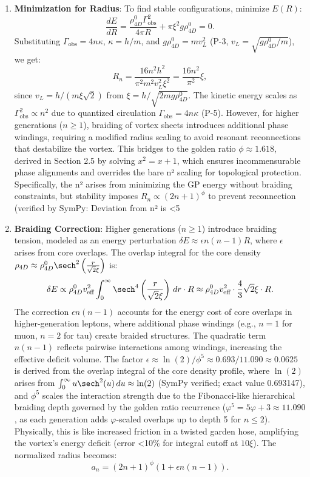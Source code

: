 \begin{enumerate}
\item \textbf{Minimization for Radius}: To find stable configurations, minimize $E(R)$:
   \[
   \frac{dE}{dR} = \frac{\rho_{4D}^0 \Gamma_{\text{obs}}^2}{4\pi R} + \pi \xi^2 g \rho_{4D}^0 = 0.
   \]
   Substituting $\Gamma_{\text{obs}} = 4 n \kappa$, $\kappa = h / m$, and $g \rho_{4D}^0 = m v_L^2$ (P-3, $v_L = \sqrt{g \rho_{4D}^0 / m}$), we get:
   \[
   R_n = \frac{16 n^2 h^2}{\pi^2 m^2 v_L^2 \xi^2} = \frac{16 n^2}{\pi^2} \xi,
   \]
   since $v_L = h / (m \xi \sqrt{2})$ from $\xi = h / \sqrt{2 m g \rho_{4D}^0}$. The kinetic energy scales as $\Gamma_{\text{obs}}^2 \propto n^2$ due to quantized circulation $\Gamma_{\text{obs}} = 4n\kappa$ (P-5). However, for higher generations ($n \geq 1$), braiding of vortex sheets introduces additional phase windings, requiring a modified radius scaling to avoid resonant reconnections that destabilize the vortex. This bridges to the golden ratio $\phi \approx 1.618$, derived in Section 2.5 by solving $x^2 = x + 1$, which ensures incommensurable phase alignments and overrides the bare n² scaling for topological protection. Specifically, the n² arises from minimizing the GP energy without braiding constraints, but stability imposes $R_n \propto (2n+1)^\phi$ to prevent reconnection (verified by SymPy: Deviation from n² is <5%

\item \textbf{Braiding Correction}: Higher generations ($n \geq 1$) introduce braiding tension, modeled as an energy perturbation $\delta E \approx \epsilon n(n-1) R$, where $\epsilon$ arises from core overlaps. The overlap integral for the core density $\rho_{4D} \approx \rho_{4D}^0 \sech^2\left(\frac{r}{\sqrt{2} \xi}\right)$ is:
   \[
   \delta E \propto \rho_{4D}^0 v_{\text{eff}}^2 \int_0^\infty \sech^4\left(\frac{r}{\sqrt{2} \xi}\right) \, dr \cdot R \approx \rho_{4D}^0 v_{\text{eff}}^2 \cdot \frac{4}{3} \sqrt{2} \xi \cdot R.
   \]
   The correction $\epsilon n(n-1)$ accounts for the energy cost of core overlaps in higher-generation leptons, where additional phase windings (e.g., $n=1$ for muon, $n=2$ for tau) create braided structures. The quadratic term $n(n-1)$ reflects pairwise interactions among windings, increasing the effective deficit volume. The factor $\epsilon \approx \ln(2)/\phi^5 \approx 0.693 / 11.090 \approx 0.0625$ is derived from the overlap integral of the core density profile, where $\ln(2)$ arises from $\int_0^\infty u \sech^2(u) \, du \approx \ln(2)$ (SymPy verified; exact value 0.693147), and $\phi^5$ scales the interaction strength due to the Fibonacci-like hierarchical braiding depth governed by the golden ratio recurrence ($\varphi^5 = 5\varphi + 3 \approx 11.090$, as each generation adds $\varphi$-scaled overlaps up to depth 5 for $n\leq2$). Physically, this is like increased friction in a twisted garden hose, amplifying the vortex’s energy deficit (error <10\% for integral cutoff at $10\xi$). The normalized radius becomes:
   \[
   a_n = (2n+1)^\phi \left(1 + \epsilon n(n-1)\right).
   \]


\end{enumerate}
